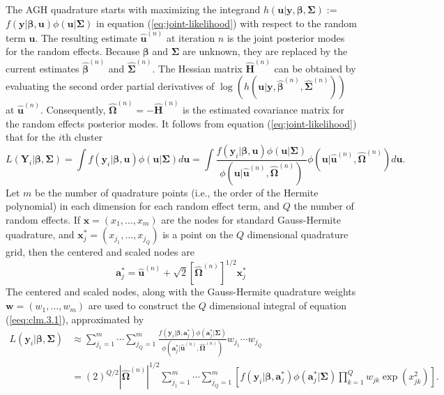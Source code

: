 The AGH quadrature starts with maximizing the integrand $h(\bm u|\bm y, \bm \beta, \bm \Sigma) :=$ 
\\$f(\bm y|\bm \beta, \bm u)\phi(\bm u|\bm \Sigma)$ in equation (\ref{eq:joint-likelihood}) with
respect to the random term $\bm u$. The resulting estimate $\hat{\bm u}^{(n)}$ at iteration $n$ is
the joint posterior modes for the random effects. Because $\bm \beta$ and $\bm \Sigma$ are unknown,
they are replaced by the current estimates $\hat{\bm \beta}^{(n)}$ and $\hat{\bm \Sigma}^{(n)}$. The
Hessian matrix $\hat{\bm H}^{(n)}$ can be obtained by evaluating the second order partial
derivatives of $\log(h(\bm u|\bm y, \hat{\bm \beta}^{(n)}, \hat{\bm \Sigma}^{(n)}))$ at $\hat{\bm
	u}^{(n)}$. Consequently, $\hat{\bm \Omega}^{(n)} =-\hat{\bm H}^{(n)} $ is the estimated covariance
matrix for the random effects posterior modes. It follows from equation (\ref{eq:joint-likelihood})
that for the $i$th cluster 
\begin{equation}\label{eeq:clm.3.1}
	L( \bm Y_i|\bm \beta, \bm \Sigma) = \int f(\bm y_i|\bm \beta, \bm u )\phi(\bm u|\bm\Sigma)d\bm u =
	\int \frac{f(\bm y_i|\bm \beta, \bm u )\phi(\bm u|\bm\Sigma)}{\phi(\bm u|\hat{\bm
			u}^{(n)},\hat{\bm \Omega}^{(n)} )}\phi(\bm u|\hat{\bm u}^{(n)},\hat{\bm \Omega}^{(n)} 
			)d\bm u.
\end{equation}
Let $m$ be the number of quadrature points (i.e., the order of the Hermite
polynomial) in each dimension for each random effect term, and $Q$ the number of random
effects. If $\bm x = (x_1, \ldots, x_m)$ are the nodes for standard Gauss-Hermite quadrature, and
$\bm x^{\ast}_j=(x_{j_1}, \ldots, x_{j_Q}) $ is a point on the $Q$ dimensional quadrature grid, then
the centered and scaled nodes are 
\begin{equation}\label{1.3.2}
	\bm  a_j^{\ast} = \hat{\bm u}^{(n)} + \sqrt{2} [\hat{\bm \Omega}^{(n)} ]^{1/2}\bm x^{\ast}_j
\end{equation}
The centered and scaled nodes, along with the Gauss-Hermite quadrature weights $\bm w = (w_1,
\ldots, w_m)$ are used to construct the $Q$ dimensional integral of equation (\ref{eeq:clm.3.1}),
approximated by 
\begin{equation}\label{eq:gh-approx}
	\begin{aligned}
		L(\bm y_i|\bm\beta, \bm \Sigma) &\approx\sum_{j_1=1}^m\cdots \sum_{j_Q=1}^m\frac{f(\bm y_i|\bm
			\beta, \bm  a_j^{\ast})\phi(\bm  a_j^{\ast}|\bm\Sigma)}{\phi(\bm  a_j^{\ast}|\hat{\bm
				u}^{(n)},\hat{\bm \Omega}^{(n)} )}w_{j_1}\cdots w_{j_Q}\\
		& = (2)^{Q/2}|\hat{\bm \Omega}^{(n)}|^{1/2}\sum_{j_1=1}^m\cdots \sum_{j_Q=1}^m\left[ f(\bm y_i|\bm
		\beta, \bm  a_j^{\ast} )\phi(\bm  a_j^{\ast}|\bm\Sigma) 
		\prod_{k=1}^Qw_{jk}\exp(x_{jk}^2)\right].
	\end{aligned}
\end{equation}
